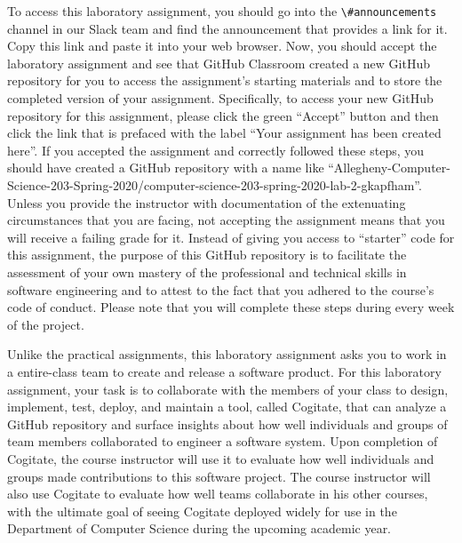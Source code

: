 \documentclass[11pt]{article}
\newcommand{\channel}[1]{\lstinline{#1}}
\begin{document}
To access this laboratory assignment, you should go into the
\channel{\#announcements} channel in our Slack team and find the announcement
that provides a link for it. Copy this link and paste it into your web browser.
Now, you should accept the laboratory assignment and see that GitHub Classroom
created a new GitHub repository for you to access the assignment's starting
materials and to store the completed version of your assignment. Specifically,
to access your new GitHub repository for this assignment, please click the green
``Accept'' button and then click the link that is prefaced with the label ``Your
assignment has been created here''. If you accepted the assignment and correctly
followed these steps, you should have created a GitHub repository with a name
like
``Allegheny-Computer-Science-203-Spring-2020/computer-science-203-spring-2020-lab-2-gkapfham''.
Unless you provide the instructor with documentation of the extenuating
circumstances that you are facing, not accepting the assignment means that you
will receive a failing grade for it.
%
Instead of giving you access to ``starter'' code for this assignment, the
purpose of this GitHub repository is to facilitate the assessment of your own
mastery of the professional and technical skills in software engineering and to
attest to the fact that you adhered to the course's code of conduct.
%
Please note that you will complete these steps during every week of the project.


Unlike the practical assignments, this laboratory assignment asks you to work in
a entire-class team to create and release a software product.
%
For this laboratory assignment, your task is to collaborate with the members of
your class to design, implement, test, deploy, and maintain a tool, called
Cogitate, that can analyze a GitHub repository and surface insights about how
well individuals and groups of team members collaborated to engineer a software
system. Upon completion of Cogitate, the course instructor will use it to
evaluate how well individuals and groups made contributions to this software
project. The course instructor will also use Cogitate to evaluate how well teams
collaborate in his other courses, with the ultimate goal of seeing Cogitate
deployed widely for use in the Department of Computer Science during the
upcoming academic year.

\vspace*{-.5em}
\end{document}
